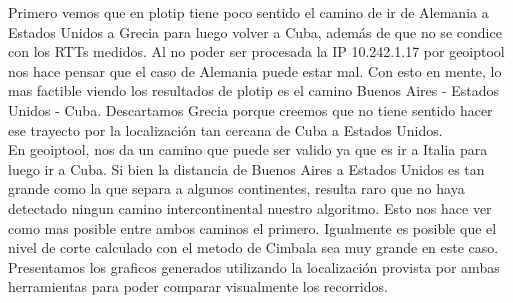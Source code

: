 Primero vemos que en plotip tiene poco sentido el camino de ir de Alemania a
Estados Unidos a Grecia para luego volver a Cuba, adem\'as de que no se condice
con los RTTs medidos. Al no poder ser procesada la IP 10.242.1.17 por geoiptool
nos hace pensar que el caso de Alemania puede estar mal. Con esto en mente, lo
mas factible viendo los resultados de plotip es el camino Buenos Aires -
Estados Unidos - Cuba. Descartamos Grecia porque creemos que no tiene sentido
hacer ese trayecto por la localizaci\'on tan cercana de Cuba a Estados
Unidos.\\

En geoiptool, nos da un camino que puede ser valido ya que es ir a Italia para
luego ir a Cuba. Si bien la distancia de Buenos Aires a Estados Unidos es tan
grande como la que separa a algunos continentes, resulta raro que no haya
detectado ningun camino intercontinental nuestro algoritmo. Esto nos hace ver
como mas posible entre ambos caminos el primero. Igualmente es posible que el
nivel de corte calculado con el metodo de Cimbala sea muy grande en este
caso.\\

Presentamos los graficos generados utilizando la localizaci\'on provista por
ambas herramientas para poder comparar visualmente los recorridos.

